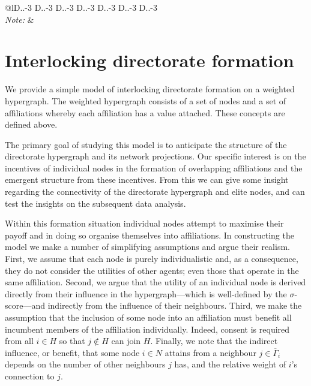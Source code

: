 \begin{subappendices}
\begin{table}[h!]
{\begin{tabular}{@{\extracolsep{5pt}}lD{.}{.}{-3} D{.}{.}{-3} D{.}{.}{-3} D{.}{.}{-3} D{.}{.}{-3} D{.}{.}{-3} D{.}{.}{-3} }
\hline
\hline \\[-1.8ex]
\textit{Note:}  &  \\
\end{tabular}
}
\caption{Results of Profit-Centrality regressions with categorisation of interlocks}
\label{profit-interlock-type}
\end{table}


\section{Interlocking directorate formation} \label{AppD}

We provide a simple model of interlocking directorate formation on a weighted hypergraph. The weighted hypergraph consists of a set of nodes and a set of affiliations whereby each affiliation has a value attached. These concepts are defined above.

The primary goal of studying this model is to anticipate the structure of the directorate hypergraph and its network projections. Our specific interest is on the incentives of individual nodes in the formation of overlapping affiliations and the emergent structure from these incentives. From this we can give some insight regarding the connectivity of the directorate hypergraph and elite nodes, and can test the insights on the subsequent data analysis.

Within this formation situation individual nodes attempt to maximise their payoff and in doing so organise themselves into affiliations. In constructing the model we make a number of simplifying assumptions and argue their realism. First, we assume that each node is purely individualistic and, as a consequence, they do not consider the utilities of other agents; even those that operate in the same affiliation. Second, we argue that the utility of an individual node is derived directly from their influence in the hypergraph---which is well-defined by the $\sigma$-score---and indirectly from the influence of their neighbours. Third, we make the assumption that the inclusion of some node into an affiliation must benefit all incumbent members of the affiliation individually. Indeed, consent is required from all $i \in H$ so that $j \notin H$ can join $H$. Finally, we note that the indirect influence, or benefit, that some node $i \in N$ attains from a neighbour $j \in \overline{\Gamma}_{i}$ depends on the number of other neighbours $j$ has, and the relative weight of $i$'s connection to $j$.


\end{subappendices}
